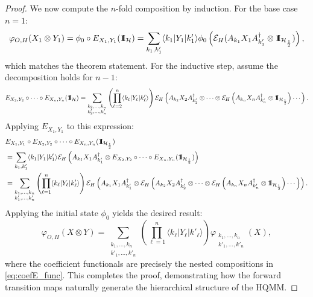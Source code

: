 \documentclass[12pt,a4paper]{article}
\def\id{{\bf 1}\!\!{\rm I}}
\begin{document}
\begin{proof}
We now compute the $n$-fold composition by induction. For the base case $n=1$:
\[
\varphi_{O,H}(X_1 \otimes Y_1) = \phi_0 \circ E_{X_1,Y_1}(\mathcal{\id}_{\mathcal{H}}) = \sum_{k_1,k'_1} \langle k_1 | Y_1 | k'_1 \rangle \phi_0\left( \mathcal{E}_H(A_{k_1}X_1 A_{k'_1}^\dagger \otimes \id_{\mathcal{H}_{\frac{1}{2}}}) \right),
\]
which matches the theorem statement. For the inductive step, assume the decomposition holds for $n-1$:
\[
E_{X_2,Y_2} \circ \cdots \circ E_{X_n,Y_n}(\mathcal{\id}_{\mathcal{H}}) = \sum_{\substack{k_2,\dots,k_n \\ k'_2,\dots,k'_n}} \left( \prod_{\ell=2}^n \langle k_\ell | Y_\ell | k'_\ell \rangle \right) \mathcal{E}_H\left( A_{k_2}X_2 A_{k'_2}^\dagger \otimes \cdots \otimes \mathcal{E}_H\left( A_{k_n}X_n A_{k'_n}^\dagger \otimes \id_{\mathcal{H}_{\frac{1}{2}}} \right) \cdots \right).
\]
Applying $E_{X_1,Y_1}$ to this expression:
\begin{align*}
&E_{X_1,Y_1} \circ E_{X_2,Y_2} \circ \cdots \circ E_{X_n,Y_n}(\id_{\mathcal{H}_{\frac{1}{2}}}) \\
&= \sum_{k_1,k'_1} \langle k_1 | Y_1 | k'_1 \rangle \mathcal{E}_H \left( A_{k_1}X_1 A_{k'_1}^\dagger \otimes E_{X_2,Y_2} \circ \cdots \circ E_{X_n,Y_n}(\id_{\mathcal{H}_{\frac{1}{2}}}) \right) \\
&= \sum_{\substack{k_1,\dots,k_n \\ k'_1,\dots,k'_n}} \left( \prod_{\ell=1}^n \langle k_\ell | Y_\ell | k'_\ell \rangle \right) \mathcal{E}_H\left( A_{k_1}X_1 A_{k'_1}^\dagger \otimes \mathcal{E}_H\left( A_{k_2}X_2 A_{k'_2}^\dagger \otimes \cdots \otimes \mathcal{E}_H\left( A_{k_n}X_n A_{k'_n}^\dagger \otimes \id_{\mathcal{H}_{\frac{1}{2}}} \right) \cdots \right) \right).
\end{align*}
Applying the initial state $\phi_0$ yields the desired result:
\[
\varphi_{O, H}(X \otimes Y) = \sum_{\substack{k_1,\dots,k_n \\ k'_1,\dots,k'_n}} \left( \prod_{\ell=1}^n \langle k_\ell | Y_\ell | k'_\ell \rangle \right) \varphi_{\substack{k_1,\dots,k_n \\ k'_1,\dots,k'_n}}(X),
\]
where the coefficient functionals are precisely the nested compositions in \eqref{eq:coefE_func}. This completes the proof, demonstrating how the forward transition maps naturally generate the hierarchical structure of the HQMM.
\end{proof}
\end{document}
